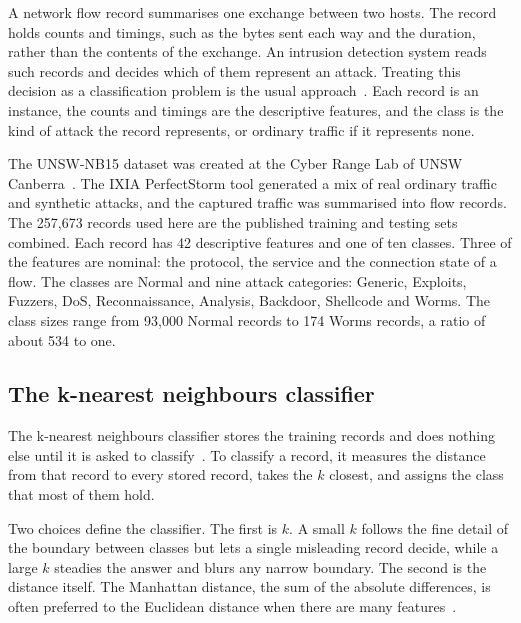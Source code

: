 \documentclass[conference,10pt]{IEEEtran}
\begin{document}
A network flow record summarises one exchange between two hosts. The record holds counts and timings, such as the bytes sent each way and the
duration, rather than the contents of the exchange. An intrusion detection system reads such records
and decides which of them represent an attack. Treating this decision as a classification problem is the usual
approach~\cite{buczak2016survey}. Each record is an instance, the counts and timings are the
descriptive features, and the class is the kind of attack the record
represents, or ordinary traffic if it represents none.

The UNSW-NB15 dataset was created at the Cyber Range Lab of UNSW
Canberra~\cite{moustafa2015unsw}. The IXIA PerfectStorm tool generated a mix
of real ordinary traffic and synthetic attacks, and the captured traffic was
summarised into flow records. The 257,673 records used here are the
published training and testing sets combined. Each record has 42
descriptive features and one of ten classes. Three of the features are
nominal: the protocol, the service and the connection state of a flow. The
classes are Normal and nine attack categories: Generic, Exploits, Fuzzers,
DoS, Reconnaissance, Analysis, Backdoor, Shellcode and Worms. The class
sizes range from 93,000 Normal records to 174 Worms records, a ratio of
about 534 to one.



\subsection{The k-nearest neighbours classifier}
\label{subsec:bg_knn}

The k-nearest neighbours classifier stores the training records and does
nothing else until it is asked to classify~\cite{cover1967nearest}. To
classify a record, it measures the distance from that record to every stored
record, takes the $k$ closest, and assigns the class that most of them hold.


Two choices define the classifier. The first is $k$. A small $k$ follows the fine detail of the boundary between classes but lets
a single misleading record decide, while a large $k$ steadies the answer and
blurs any narrow boundary. The second is the distance itself. The Manhattan distance, the sum of the absolute differences, is often
preferred to the Euclidean distance when there are many
features~\cite{aggarwal2001surprising}.
\end{document}
